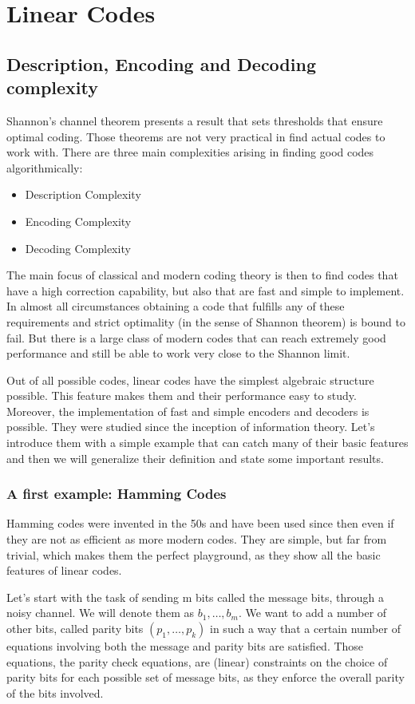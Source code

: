 
\chapter{Linear Codes}
\section{Description, Encoding and Decoding complexity}
Shannon's channel theorem presents a result that sets thresholds that ensure optimal coding. Those theorems are not very practical in find actual codes to work with. There are three main complexities arising in finding good codes algorithmically:
\begin{itemize}
	\item Description Complexity
	\item Encoding Complexity
	\item Decoding Complexity
\end{itemize}

The main focus of classical and modern coding theory is then to find codes that have a high correction capability, but also that are fast and simple to implement. In almost all circumstances obtaining a code that fulfills any of these requirements and strict optimality (in the sense of Shannon theorem) is bound to fail. But there is a large class of modern codes that can reach extremely good performance and still be able to work very close to the Shannon limit. 

Out of all possible codes, linear codes have the simplest algebraic structure possible. This feature makes them and their performance easy to study. Moreover, the implementation of fast and simple encoders and decoders is possible. They were studied since the inception of information theory. Let's introduce them with a simple example that can catch many of their basic features and then we will generalize their definition and state some important results.
 
\subsection{A first example: Hamming Codes}
Hamming codes were invented in the 50s and have been used since then even if they are not as efficient as more modern codes. They are simple, but far from trivial, which makes them the perfect playground, as they show all the basic features of linear codes. 

Let's start with the task of sending m bits called the message bits, through a noisy channel. We will denote them as $b_1, \dots, b_m$. We want to add a number of other bits, called parity bits $(p_1, \dots, p_k)$ in such a way that a certain number of equations involving both the message and parity bits are satisfied. Those equations, the parity check equations, are (linear) constraints on the choice of parity bits for each possible set of message bits, as they enforce the overall parity of the bits involved.

